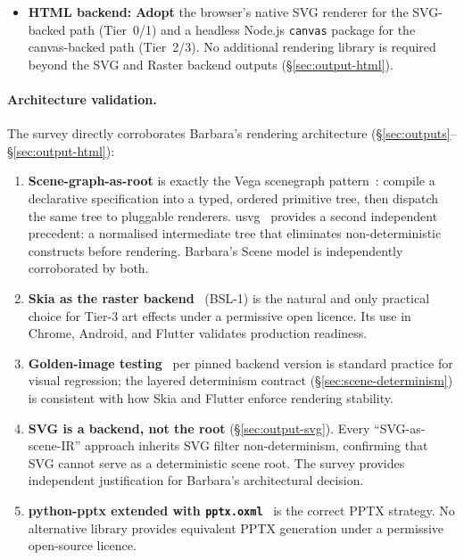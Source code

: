 \begin{itemize}
  \item \textbf{HTML backend:} \textbf{Adopt} the browser's native SVG renderer for
        the SVG-backed path (Tier~0/1) and a headless Node.js \texttt{canvas} package
        for the canvas-backed path (Tier~2/3). No additional rendering library is
        required beyond the SVG and Raster backend outputs (\S\ref{sec:output-html}).
\end{itemize}

\paragraph{Architecture validation.}
The survey directly corroborates Barbara's rendering architecture
(\S\ref{sec:outputs}--\S\ref{sec:output-html}):

\begin{enumerate}
  \item \textbf{Scene-graph-as-root} is exactly the Vega scenegraph
        pattern~\cite{vega-scenegraph,vegalite2017}: compile a declarative
        specification into a typed, ordered primitive tree, then dispatch the same
        tree to pluggable renderers.
        usvg~\cite{usvg} provides a second independent precedent: a normalised
        intermediate tree that eliminates non-deterministic constructs before
        rendering.
        Barbara's Scene model is independently corroborated by both.

  \item \textbf{Skia as the raster backend}~\cite{skia} (BSL-1) is the natural and
        only practical choice for Tier-3 art effects under a permissive open licence.
        Its use in Chrome, Android, and Flutter validates production readiness.

  \item \textbf{Golden-image testing}~\cite{golden-image-testing} per pinned backend
        version is standard practice for visual regression; the layered determinism
        contract (\S\ref{sec:scene-determinism}) is consistent with how Skia and
        Flutter enforce rendering stability.

  \item \textbf{SVG is a backend, not the root} (\S\ref{sec:output-svg}).
        Every ``SVG-as-scene-IR'' approach inherits SVG filter non-determinism,
        confirming that SVG cannot serve as a deterministic scene root.
        The survey provides independent justification for Barbara's architectural
        decision.

  \item \textbf{python-pptx extended with \texttt{pptx.oxml}}~\cite{python-pptx} is
        the correct PPTX strategy. No alternative library provides equivalent PPTX
        generation under a permissive open-source licence.
\end{enumerate}

